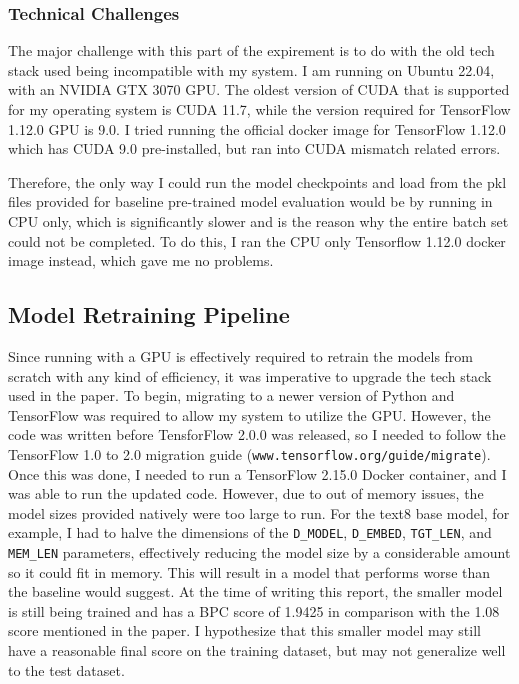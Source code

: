 \documentclass[11pt]{article}
\begin{document}
\subsubsection{Technical Challenges}
The major challenge with this part of the expirement is to do with the old tech stack used being incompatible with my system. I am running on Ubuntu 22.04, with an NVIDIA GTX 3070 GPU. The oldest version of CUDA that is supported for my operating system is CUDA 11.7, while the version required for TensorFlow 1.12.0 GPU is 9.0. I tried running the official docker image for TensorFlow 1.12.0 which has CUDA 9.0 pre-installed, but ran into CUDA mismatch related errors. 

Therefore, the only way I could run the model checkpoints and load from the pkl files provided for baseline pre-trained model evaluation would be by running in CPU only, which is significantly slower and is the reason why the entire batch set could not be completed. To do this, I ran the CPU only Tensorflow 1.12.0 docker image instead, which gave me no problems.

\subsection{Model Retraining Pipeline}

Since running with a GPU is effectively required to retrain the models from scratch with any kind of efficiency, it was imperative to upgrade the tech stack used in the paper. To begin, migrating to a newer version of Python and TensorFlow was required to allow my system to utilize the GPU. However, the code was written before TensforFlow 2.0.0 was released, so I needed to follow the TensorFlow 1.0 to 2.0 migration guide (\verb|www.tensorflow.org/guide/migrate|). Once this was done, I needed to run a TensorFlow 2.15.0 Docker container, and I was able to run the updated code. However, due to out of memory issues, the model sizes provided natively were too large to run. For the text8 base model, for example, I had to halve the dimensions of the \verb|D_MODEL|, \verb|D_EMBED|, \verb|TGT_LEN|, and \verb|MEM_LEN| parameters, effectively reducing the model size by a considerable amount so it could fit in memory. This will result in a model that performs worse than the baseline would suggest. At the time of writing this report, the smaller model is still being trained and has a BPC score of 1.9425 in comparison with the 1.08 score mentioned in the paper. I hypothesize that this smaller model may still have a reasonable final score on the training dataset, but may not generalize well to the test dataset.
\end{document}
